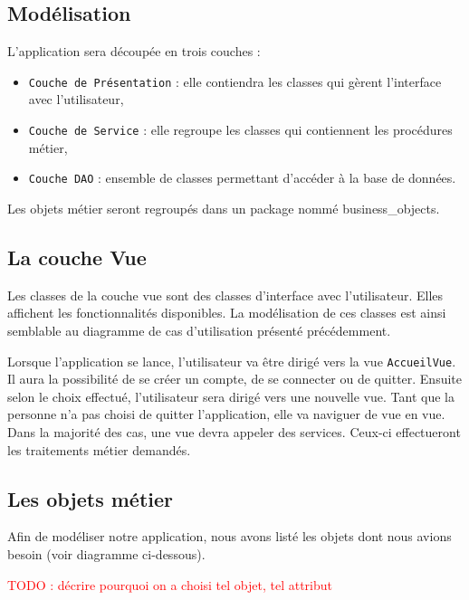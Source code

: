 \documentclass[11pt]{article}
\begin{document}
\subsection{Modélisation}

L'application sera découpée en trois couches :
\begin{itemize}
    \item \texttt{Couche de Présentation} : elle contiendra les classes qui gèrent l'interface avec l'utilisateur,
    \item \texttt{Couche de Service} : elle regroupe les classes qui contiennent les procédures métier,
    \item \texttt{Couche DAO} : ensemble de classes permettant d'accéder à la base de données.
\end{itemize}

\bigbreak

Les objets métier seront regroupés dans un package nommé business\_objects.

\subsection{La couche Vue}

Les classes de la couche vue sont des classes d'interface avec l'utilisateur. Elles affichent les fonctionnalités disponibles. La modélisation de ces classes est ainsi semblable au diagramme de cas d'utilisation présenté précédemment.

\bigbreak

Lorsque l'application se lance, l'utilisateur va être dirigé vers la vue \texttt{AccueilVue}. Il aura la possibilité de se créer un compte, de se connecter ou de quitter. Ensuite selon le choix effectué, l'utilisateur sera dirigé vers une nouvelle vue. Tant que la personne n'a pas choisi de quitter l'application, elle va naviguer de vue en vue. Dans la majorité des cas, une vue devra appeler des services. Ceux-ci effectueront les traitements métier demandés.


\subsection{Les objets métier}

Afin de modéliser notre application, nous avons listé les objets dont nous avions besoin (voir diagramme ci-dessous).


\textcolor{red}{TODO : décrire pourquoi on a choisi tel objet, tel attribut}
\end{document}
